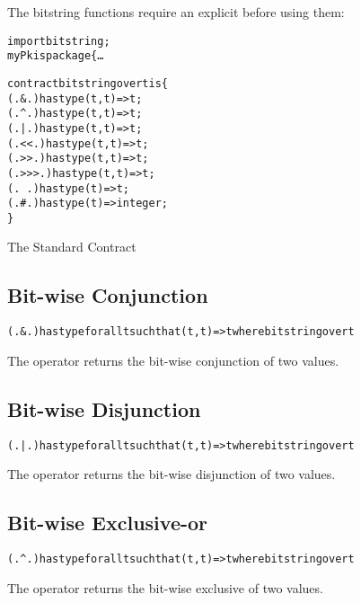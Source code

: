 \begin{aside}
The bitstring functions require an explicit  before using them:
\begin{alltt}
import bitstring;
myPk is package \{ \ldots
\end{alltt}
\end{aside}

\begin{program}
\begin{alltt}
contract bitstring over t is \{
    (.&.) has type (t,t)=>t;
    (.^.) has type (t,t)=>t;
    (.|.) has type (t,t)=>t;
    (.<<.) has type (t,t)=>t;
    (.>>.) has type (t,t)=>t;
    (.>>>.) has type (t,t)=>t;
    (.~.) has type (t)=>t;
    (.#.) has type (t)=>integer;
\}
\end{alltt}
\caption{The Standard  Contract\label{bitstringContractDef}}
\end{program}

\subsection{ Bit-wise Conjunction}
\label{bitAnd}
\begin{alltt}
(.&.) has type for all t such that (t,t)=>t where bitstring over t
\end{alltt}

The  operator returns the bit-wise conjunction of two values.

\subsection{ Bit-wise Disjunction}
\label{bitOr}
\begin{alltt}
(.|.) has type for all t such that (t,t)=>t where bitstring over t
\end{alltt}

The  operator returns the bit-wise disjunction of two values.

\subsection{ Bit-wise Exclusive-or}
\label{bitXor}
\begin{alltt}
(.^.) has type for all t such that (t,t)=>t where bitstring over t
\end{alltt}

The  operator returns the bit-wise exclusive of two values.

